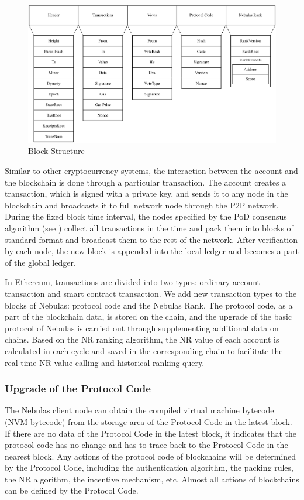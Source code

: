 \begin{figure}[!h]
\centering
\includegraphics[width=13.8cm]{./figs/block}
\caption{Block Structure}
\label{fig:block}
\end{figure}

Similar to other cryptocurrency systems, the interaction between the account and the blockchain is done through a particular transaction. The account creates a transaction, which is signed with a private key, and sends it to any node in the blockchain and broadcasts it to full network node through the P2P network. During the fixed block time interval, the nodes specified by the PoD consensus algorithm (see ) collect all transactions in the time and pack them into blocks of standard format and broadcast them to the rest of the network. After verification by each node, the new block is appended into the local ledger and becomes a part of the global ledger.

In Ethereum, transactions are divided into two types: ordinary account transaction and smart contract transaction. We add new transaction types to the blocks of Nebulas: protocol code and the Nebulas Rank. The protocol code, as a part of the blockchain data, is stored on the chain, and the upgrade of the basic protocol of Nebulas is carried out through supplementing additional data on chains. Based on the NR ranking algorithm, the NR value of each account is calculated in each cycle and saved in the corresponding chain to facilitate the real-time NR value calling and historical ranking query.

\subsubsection{Upgrade of the Protocol Code}

The Nebulas client node can obtain the compiled virtual machine bytecode (NVM bytecode) from the storage area of the Protocol Code in the latest block. If there are no data of the Protocol Code in the latest block, it indicates that the protocol code has no change and has to trace back to the Protocol Code in the nearest block. Any actions of the protocol code of blockchains will be determined by the Protocol Code, including the authentication algorithm, the packing rules, the NR algorithm, the incentive mechanism, etc. Almost all actions of blockchains can be defined by the Protocol Code.

